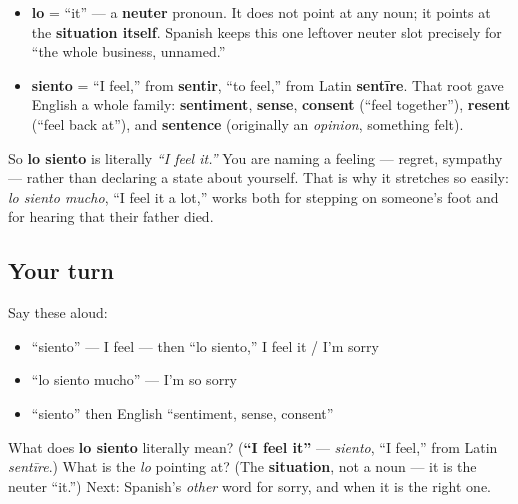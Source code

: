 \begin{cousinweb}
\begin{itemize}
\raggedright
  \item \textbf{lo} = \textquotedblleft{}it\textquotedblright{} — a \textbf{neuter} pronoun. It does not point at any noun; it points at the \textbf{situation itself}. Spanish keeps this one leftover neuter slot precisely for \textquotedblleft{}the whole business, unnamed.\textquotedblright{}
  \item \textbf{siento} = \textquotedblleft{}I feel,\textquotedblright{} from \textbf{sentir}, \textquotedblleft{}to feel,\textquotedblright{} from Latin \textbf{sentīre}. That root gave English a whole family: \textbf{sentiment}, \textbf{sense}, \textbf{consent} (\textquotedblleft{}feel together\textquotedblright{}), \textbf{resent} (\textquotedblleft{}feel back at\textquotedblright{}), and \textbf{sentence} (originally an \emph{opinion}, something felt).
\end{itemize}

So \textbf{lo siento} is literally \emph{\textquotedblleft{}I feel it.\textquotedblright{}} You are naming a feeling — regret, sympathy — rather than declaring a state about yourself. That is why it stretches so easily: \emph{lo siento mucho}, \textquotedblleft{}I feel it a lot,\textquotedblright{} works both for stepping on someone's foot and for hearing that their father died.
\end{cousinweb}

\subsection*{Your turn}
Say these aloud:

\begin{itemize}
\raggedright
  \item \textquotedblleft{}siento\textquotedblright{} — I feel — then \textquotedblleft{}lo siento,\textquotedblright{} I feel it / I'm sorry
  \item \textquotedblleft{}lo siento mucho\textquotedblright{} — I'm so sorry
  \item \textquotedblleft{}siento\textquotedblright{} then English \textquotedblleft{}sentiment, sense, consent\textquotedblright{}
\end{itemize}

\begin{tcolorbox}[breakable,colback=teal!4,colframe=teal!35!black,title={Before you move on}]
What does \textbf{lo siento} literally mean? (\textbf{\textquotedblleft{}I feel it\textquotedblright{}} — \emph{siento}, \textquotedblleft{}I feel,\textquotedblright{} from Latin \emph{sentīre}.) What is the \emph{lo} pointing at? (The \textbf{situation}, not a noun — it is the neuter \textquotedblleft{}it.\textquotedblright{}) Next: Spanish's \emph{other} word for sorry, and when it is the right one.
\end{tcolorbox}
